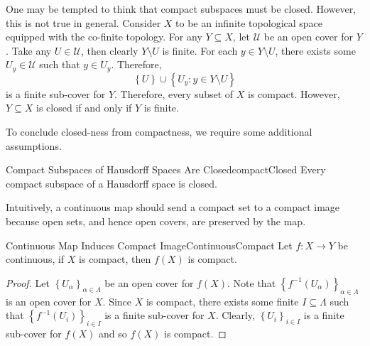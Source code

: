 \documentclass[math]{amznotes}
\theoremstyle{remark}
\begin{document}
One may be tempted to think that compact subspaces must be closed. However, this is not true in general. Consider $X$ to be an infinite topological space equipped with the co-finite topology. For any $Y \subseteq X$, let $\mathcal{U}$ be an open cover for $Y$. Take any $U \in \mathcal{U}$, then clearly $Y \setminus U$ is finite. For each $y \in Y \setminus U$, there exists some $U_y \in \mathcal{U}$ such that $y \in U_y$. Therefore, 
\begin{equation*}
    \left\{U\right\} \cup \left\{U_y \colon y \in Y \setminus U\right\}
\end{equation*}
is a finite sub-cover for $Y$. Therefore, every subset of $X$ is compact. However, $Y \subseteq X$ is closed if and only if $Y$ is finite.

To conclude closed-ness from compactness, we require some additional assumptions.
\begin{probox}{Compact Subspaces of Hausdorff Spaces Are Closed}{compactClosed}
    Every compact subspace of a Hausdorff space is closed.
\end{probox}
Intuitively, a continuous map should send a compact set to a compact image because open sets, and hence open covers, are preserved by the map.
\begin{probox}{Continuous Map Induces Compact Image}{ContinuousCompact}
    Let $f \colon X \to Y$ be continuous, if $X$ is compact, then $f\left(X\right)$ is compact.
    \tcblower
    \begin{proof}
        Let $\left\{U_{\alpha}\right\}_{\alpha \in \Lambda}$ be an open cover for $f\left(X\right)$. Note that $\left\{f^{-1}\left(U_{\alpha}\right)\right\}_{\alpha \in \Lambda}$ is an open cover for $X$. Since $X$ is compact, there exists some finite $I \subseteq \Lambda$ such that $\left\{f^{-1}\left(U_i\right)\right\}_{i \in I}$ is a finite sub-cover for $X$. Clearly, $\left\{U_i\right\}_{i \in I}$ is a finite sub-cover for $f\left(X\right)$ and so $f\left(X\right)$ is compact.
    \end{proof}
\end{probox}
\end{document}

